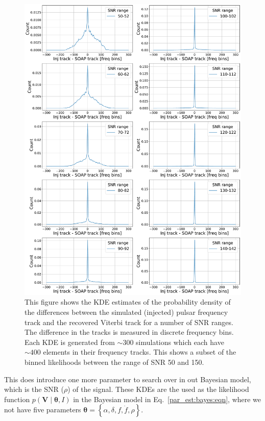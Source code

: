 \begin{figure}[ht]

    \centering
    \includegraphics[width=\linewidth]{C5_parameter/KDE_range_50_100.pdf}
    \caption[KDE of likelihood in different \gls{SNR} ranges]{This figure shows the \gls{KDE} estimates of the probability density of the differences between the simulated (injected) pulsar frequency track and the recovered Viterbi track for a number of \gls{SNR} ranges. The difference in the tracks is measured in discrete frequency bins. Each \gls{KDE} is generated from $\sim 300$ simulations which each have $\sim 400$ elements in their frequency tracks. This shows a subset of the binned likelihoods between the range of \gls{SNR} 50 and 150.}
    \label{par_est:bayes:likelihood:kde142}
    
    \end{figure}
%

This does introduce one more parameter to search over in out Bayesian model, which is the \gls{SNR} ($\rho$) of the signal.
These \glspl{KDE} are the used as the likelihood function $p(\bm{V} \mid \bm{\theta}, I)$ in the Bayesian model in Eq.~\ref{par_est:bayes:eqn}, where we not have five parameters $\bm{\theta} = \left\{\alpha, \delta, f, \dot{f} , \rho \right\}$.


